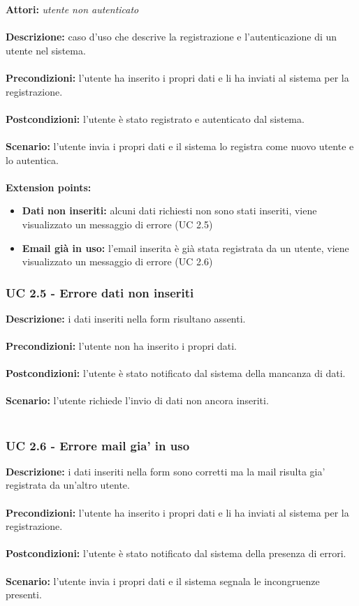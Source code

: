 \documentclass[a4paper,11pt]{article}
\begin{document}
\textbf{Attori:} \textit{utente non autenticato}
\\ \\
\textbf{Descrizione:} caso d'uso che descrive la registrazione e l'autenticazione di un utente nel sistema.\\
\\
\textbf{Precondizioni:} l'utente ha inserito i propri dati e li ha inviati al sistema per la registrazione.\\
\\
\textbf{Postcondizioni:} l’utente è stato registrato e autenticato dal sistema.\\
\\
\textbf{Scenario:} l’utente invia i propri dati e il sistema lo registra come nuovo utente e lo autentica.\\
\\
\textbf{Extension points:} 
\begin{itemize}
	\item \textbf{Dati non inseriti:} alcuni dati richiesti non sono stati inseriti, viene visualizzato un messaggio di errore (UC 2.5)
	\item \textbf{Email già in uso:} l'email inserita è già stata registrata da un utente, viene visualizzato un messaggio di errore (UC 2.6)
\end{itemize}

\subsubsection{UC 2.5 - Errore dati non inseriti}

\textbf{Descrizione:} i dati inseriti nella form risultano assenti.\\
\\
\textbf{Precondizioni:} l'utente non ha inserito i propri dati.\\
\\
\textbf{Postcondizioni:} l’utente è stato notificato dal sistema della mancanza di dati.\\
\\
\textbf{Scenario:} l’utente richiede l'invio di dati non ancora inseriti.\\
\\

\subsubsection{UC 2.6 - Errore mail gia' in uso}

\textbf{Descrizione:} i dati inseriti nella form sono corretti ma la mail risulta gia' registrata da un'altro utente.\\
\\
\textbf{Precondizioni:} l'utente ha inserito i propri dati e li ha inviati al sistema per la registrazione.\\
\\
\textbf{Postcondizioni:} l’utente è stato notificato dal sistema della presenza di errori.\\
\\
\textbf{Scenario:} l’utente invia i propri dati e il sistema segnala le incongruenze presenti.\\
\\
\end{document}

